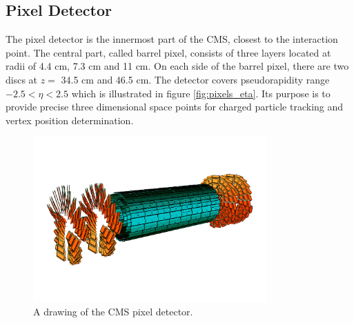 \subsection{Pixel Detector}

The pixel detector is the innermost part of the CMS, closest to the interaction point. The central part, called barrel pixel, consists of three layers located at radii of 4.4 cm, 7.3 cm and 11 cm. On each side of the barrel pixel, there are two discs at $z=$ 34.5 cm and 46.5 cm. The detector covers pseudorapidity range $-2.5<\eta<2.5$ which is illustrated in figure \ref{fig:pixels_eta}. Its purpose is to provide precise three dimensional space points for charged particle tracking and vertex position determination.
\begin{figure}[htbp]
	\centering
		\includegraphics[width=0.8\textwidth]{Figures/pixel_detector.png}
	\caption[CMS Pixel Detector]{A drawing of the CMS pixel detector. \cite{Chatrchyan:2008aa}}
	\label{fig:pixels}
\end{figure}
